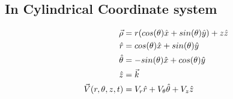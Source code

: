 \documentclass{book}
\begin{document}
\subsection{In Cylindrical Coordinate system}
\begin{equation*}
\begin{split}
\vec{\rho}&=r(cos(\theta)\hat{x}+sin(\theta)\hat{y})+z\hat{z}\\
\hat{r}&=cos(\theta)\hat{x}+sin(\theta)\hat{y}\\
\hat{\theta}&=-sin(\theta)\hat{x}+cos(\theta)\hat{y}\\
\hat{z}&=\vec{k}\\
\vspace{0.2cm}\vec{V}(r,\theta,z,t)&=V_r\hat{r}+V_\theta\hat{\theta}+V_z\hat{z}
\\
\end{split}
\end{equation*}
\end{document}
